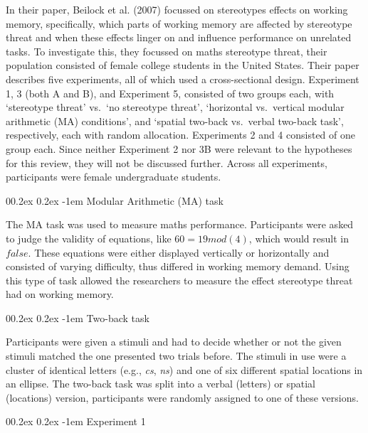 \documentclass[
  stu,floatsintext]{apa7}
\makeatletter
\let\oldparagraph\paragraph
\renewcommand{\paragraph}[1]{\oldparagraph{#1}\mbox{}}
\renewcommand{\paragraph}{\@startsection{paragraph}{4}{\parindent}%
  {0\baselineskip \@plus 0.2ex \@minus 0.2ex}%
  {-1em}%
  {\normalfont\normalsize\bfseries\itshape\typesectitle}}
\renewcommand{\paragraph}{\@startsection{paragraph}{4}{\parindent}%
  {0\baselineskip \@plus 0.2ex \@minus 0.2ex}%
  {-1em}%
  {\normalfont\normalsize\bfseries\typesectitle}}
\makeatother
\begin{document}
In their paper, Beilock et al. (2007) focussed on stereotypes effects on working memory, specifically, which parts of working memory are affected by stereotype threat and when these effects linger on and influence performance on unrelated tasks.
To investigate this, they focussed on maths stereotype threat, their population consisted of female college students in the United States.
Their paper describes five experiments, all of which used a cross-sectional design.
Experiment 1, 3 (both A and B), and Experiment 5, consisted of two groups each, with `stereotype threat' vs.~`no stereotype threat', `horizontal vs.~vertical modular arithmetic (MA) conditions', and `spatial two-back vs.~verbal two-back task', respectively, each with random allocation.
Experiments 2 and 4 consisted of one group each.
Since neither Experiment 2 nor 3B were relevant to the hypotheses for this review, they will not be discussed further.
Across all experiments, participants were female undergraduate students.

\paragraph{Modular Arithmetic (MA) task}\label{modular-arithmetic-ma-task}

The MA task was used to measure maths performance.
Participants were asked to judge the validity of equations, like \(60 = 19 mod(4)\), which would result in \(false\).
These equations were either displayed vertically or horizontally and consisted of varying difficulty, thus differed in working memory demand.
Using this type of task allowed the researchers to measure the effect stereotype threat had on working memory.

\paragraph{Two-back task}\label{two-back-task}

Participants were given a stimuli and had to decide whether or not the given stimuli matched the one presented two trials before.
The stimuli in use were a cluster of identical letters (e.g., \emph{cs}, \emph{ns}) and one of six different spatial locations in an ellipse.
The two-back task was split into a verbal (letters) or spatial (locations) version, participants were randomly assigned to one of these versions.

\paragraph{Experiment 1}\label{experiment-1}
\end{document}
